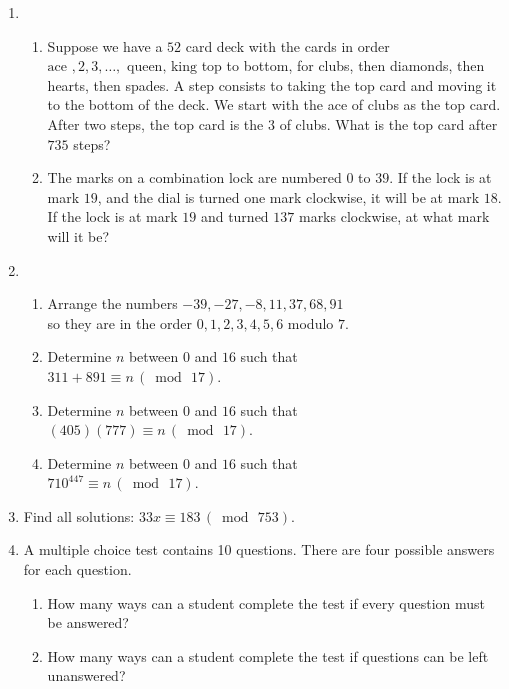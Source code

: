 \documentclass[11pt]{amsart}
\begin{document}
\begin{enumerate}

\item
\begin{enumerate}
\item Suppose we have a $52$ card deck with the cards in order $\text{ace }, 2, 3, \ldots,\text{ queen, king}$ 
top to bottom, for clubs, then diamonds, then hearts, then spades. A step consists to taking the top card and moving it to the bottom of the deck. We start with the ace of clubs as the top card. After two steps, the top card is the $3$ of clubs. What is the top card after $735$ steps?\\[3pt]

\item The marks on a combination lock are numbered $0$ to $39$. If the lock is at  mark $19$, and the dial is turned one mark clockwise, it will be
at mark $18$. If the lock is at mark $19$ and turned $137$ marks clockwise, at what mark will it be?
\\[5pt]
\end{enumerate}

\item 
\begin{enumerate}
\item Arrange the numbers $-39, -27, -8, 11, 37, 68, 91$ \\
so they are in the order $0,1,2,3,4,5,6$ modulo $7$.\\[5pt]
\item  Determine $n$ between $0$ and $16$ such that\\
 $311+891 \equiv n \,(\bmod\,17)$.\\[3pt]
 \item Determine $n$ between $0$ and $16$ such that \\
$(405)(777) \equiv n \,(\bmod\,17)$.\\[3pt]
\item Determine $n$ between $0$ and $16$ such that\\
 $710^{447} \equiv n \,(\bmod\,17)$.\\[5pt]
\end{enumerate}

\item Find all solutions: $33x\equiv 183\,(\bmod\,753 )$. \\[5pt]

\item  A multiple choice test contains 10 questions. There are four possible answers
for each question.\\[3pt]
\begin{enumerate}
\item How many ways can a student complete the test if every question 
must be answered?\\[3pt]
\item How many ways can a student complete the test if questions 
can be left unanswered?\\[5pt]
\end{enumerate}


\end{enumerate}
\end{document}
